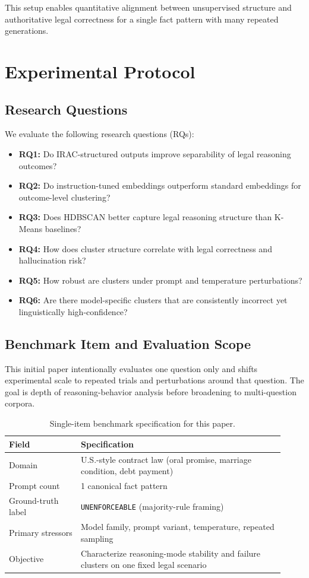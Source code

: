 \documentclass[11pt]{article}
\begin{document}
This setup enables quantitative alignment between unsupervised structure and authoritative legal correctness for a single fact pattern with many repeated generations.

\section{Experimental Protocol}
\subsection{Research Questions}
We evaluate the following research questions (RQs):
\begin{itemize}[leftmargin=1.5em]
    \item \textbf{RQ1:} Do IRAC-structured outputs improve separability of legal reasoning outcomes?
    \item \textbf{RQ2:} Do instruction-tuned embeddings outperform standard embeddings for outcome-level clustering?
    \item \textbf{RQ3:} Does HDBSCAN better capture legal reasoning structure than K-Means baselines?
    \item \textbf{RQ4:} How does cluster structure correlate with legal correctness and hallucination risk?
    \item \textbf{RQ5:} How robust are clusters under prompt and temperature perturbations?
    \item \textbf{RQ6:} Are there model-specific clusters that are consistently incorrect yet linguistically high-confidence?
\end{itemize}

\subsection{Benchmark Item and Evaluation Scope}
This initial paper intentionally evaluates one question only and shifts experimental scale to repeated trials and perturbations around that question. The goal is depth of reasoning-behavior analysis before broadening to multi-question corpora.

\begin{table}[ht]
\centering
\caption{Single-item benchmark specification for this paper.}
\label{tab:single_item_scope}
\begin{tabular}{p{0.24\linewidth}p{0.68\linewidth}}
\toprule
Field & Specification \\
\midrule
Domain & U.S.-style contract law (oral promise, marriage condition, debt payment) \\
Prompt count & 1 canonical fact pattern \\
Ground-truth label & \texttt{UNENFORCEABLE} (majority-rule framing) \\
Primary stressors & Model family, prompt variant, temperature, repeated sampling \\
Objective & Characterize reasoning-mode stability and failure clusters on one fixed legal scenario \\
\bottomrule
\end{tabular}
\end{table}
\end{document}
